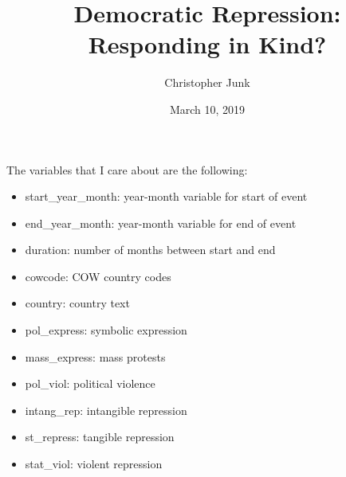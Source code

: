 \documentclass[ignorenonframetext,]{beamer}
\title{Democratic Repression: Responding in Kind?}
\author{Christopher Junk}
\date{March 10, 2019}
\providecommand{\tightlist}{%
  \setlength{\itemsep}{0pt}\setlength{\parskip}{0pt}}
\begin{document}
\frame{\titlepage}

\begin{frame}[fragile]

The variables that I care about are the following:

\begin{itemize}
\tightlist
\item
  start\_year\_month: year-month variable for start of event\\
\item
  end\_year\_month: year-month variable for end of event\\
\item
  duration: number of months between start and end\\
\item
  cowcode: COW country codes\\
\item
  country: country text\\
\item
  pol\_express: symbolic expression\\
\item
  mass\_express: mass protests\\
\item
  pol\_viol: political violence\\
\item
  intang\_rep: intangible repression\\
\item
  st\_repress: tangible repression\\
\item
  stat\_viol: violent repression
\end{itemize}


\end{frame}
\end{document}
